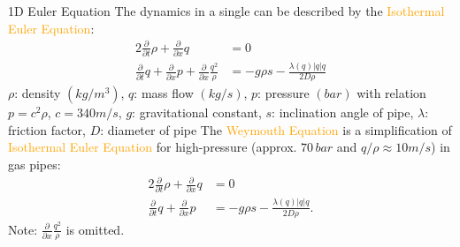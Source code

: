 \documentclass[8pt]{beamer}
\begin{document}
\begin{frame}{1D Euler Equation}
The dynamics in a single can be described by the \textcolor{orange}{Isothermal Euler Equation}:
\begin{alignat}{2}
\frac{\partial}{\partial t} \rho + \frac{\partial}{\partial x} q  &= 0 \label{Eq:3.7}\\
\frac{\partial}{\partial t} q + \frac{\partial}{\partial x} p + \frac{\partial}{\partial x} \frac{q^2}{\rho} &= - g\rho s - \frac{\lambda(q)|q|q}{2D\rho} \label{Eq:3.8}
\end{alignat}
$\rho$: density $(kg/m^3)$, 
$q$: mass flow $(kg/s)$,
$p$: pressure $(bar)$ with relation $p = c^2 \rho$,  $c = 340 m/s$,
$g$: gravitational constant,
$s$: inclination angle of pipe, 
$\lambda$: friction factor,
$D$: diameter of pipe \newline\newline
The \textcolor{orange}{Weymouth Equation} is a simplification of \textcolor{orange}{Isothermal Euler Equation} for high-pressure (approx.  $70 \, bar$ and $q/\rho \approx 10 m/s$) in gas pipes: 
\begin{alignat}{2}
\frac{\partial}{\partial t} \rho + \frac{\partial}{\partial x} q  &= 0 \label{Eq:3.12}\\
\frac{\partial}{\partial t} q + \frac{\partial}{\partial x} p  &= - g\rho s - \frac{\lambda(q)|q|q}{2D\rho} \label{Eq:3.13}.
\end{alignat} 
\textcolor{bluepurp}{Note:} $ \frac{\partial}{\partial x} \frac{q^2}{\rho}$ is omitted. 
\end{frame}
\end{document}
